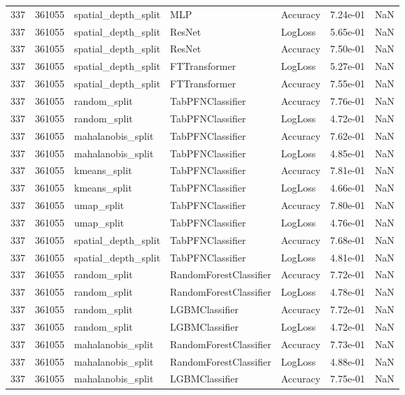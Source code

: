 \begin{tabular}{rrlllrr}
337 & 361055 & spatial\_depth\_split & MLP & Accuracy & 7.24e-01 & NaN \\
337 & 361055 & spatial\_depth\_split & ResNet & LogLoss & 5.65e-01 & NaN \\
337 & 361055 & spatial\_depth\_split & ResNet & Accuracy & 7.50e-01 & NaN \\
337 & 361055 & spatial\_depth\_split & FTTransformer & LogLoss & 5.27e-01 & NaN \\
337 & 361055 & spatial\_depth\_split & FTTransformer & Accuracy & 7.55e-01 & NaN \\
337 & 361055 & random\_split & TabPFNClassifier & Accuracy & 7.76e-01 & NaN \\
337 & 361055 & random\_split & TabPFNClassifier & LogLoss & 4.72e-01 & NaN \\
337 & 361055 & mahalanobis\_split & TabPFNClassifier & Accuracy & 7.62e-01 & NaN \\
337 & 361055 & mahalanobis\_split & TabPFNClassifier & LogLoss & 4.85e-01 & NaN \\
337 & 361055 & kmeans\_split & TabPFNClassifier & Accuracy & 7.81e-01 & NaN \\
337 & 361055 & kmeans\_split & TabPFNClassifier & LogLoss & 4.66e-01 & NaN \\
337 & 361055 & umap\_split & TabPFNClassifier & Accuracy & 7.80e-01 & NaN \\
337 & 361055 & umap\_split & TabPFNClassifier & LogLoss & 4.76e-01 & NaN \\
337 & 361055 & spatial\_depth\_split & TabPFNClassifier & Accuracy & 7.68e-01 & NaN \\
337 & 361055 & spatial\_depth\_split & TabPFNClassifier & LogLoss & 4.81e-01 & NaN \\
337 & 361055 & random\_split & RandomForestClassifier & Accuracy & 7.72e-01 & NaN \\
337 & 361055 & random\_split & RandomForestClassifier & LogLoss & 4.78e-01 & NaN \\
337 & 361055 & random\_split & LGBMClassifier & Accuracy & 7.72e-01 & NaN \\
337 & 361055 & random\_split & LGBMClassifier & LogLoss & 4.72e-01 & NaN \\
337 & 361055 & mahalanobis\_split & RandomForestClassifier & Accuracy & 7.73e-01 & NaN \\
337 & 361055 & mahalanobis\_split & RandomForestClassifier & LogLoss & 4.88e-01 & NaN \\
337 & 361055 & mahalanobis\_split & LGBMClassifier & Accuracy & 7.75e-01 & NaN \\

\end{tabular}
